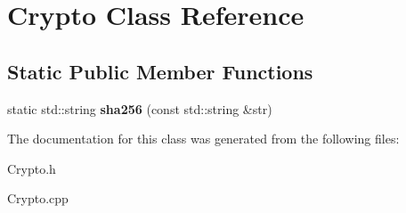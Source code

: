 \hypertarget{classCrypto}{\section{Crypto Class Reference}
\label{classCrypto}
}
\subsection*{Static Public Member Functions}
\begin{DoxyCompactItemize}
\item 
\hypertarget{classCrypto_a1415bcac3387c1142656a4d4a33c5ea8}{static std\-::string {\bfseries sha256} (const std\-::string \&str)}\label{classCrypto_a1415bcac3387c1142656a4d4a33c5ea8}

\end{DoxyCompactItemize}


The documentation for this class was generated from the following files\-:\begin{DoxyCompactItemize}
\item 
Crypto.\-h\item 
Crypto.\-cpp\end{DoxyCompactItemize}
